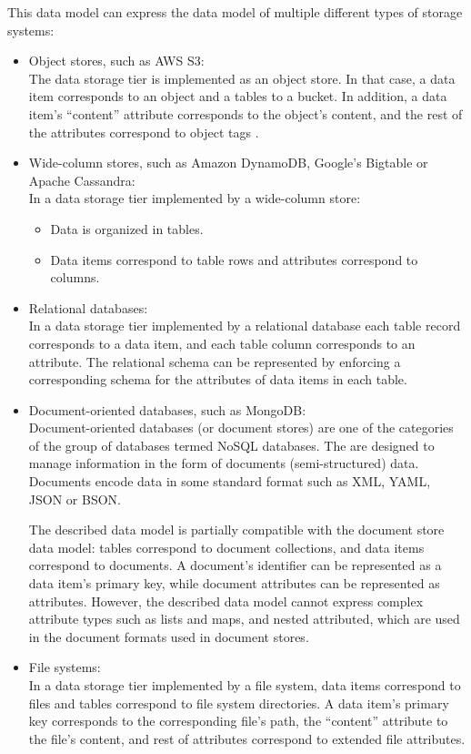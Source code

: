 This data model can express the data model of multiple different types of storage systems:
\begin{itemize}
  \item Object stores, such as AWS S3: \\
  The data storage tier is implemented as an object store.
  In that case, a data item corresponds to an object and a tables to a bucket.
  In addition, a data item's ``content'' attribute corresponds to the object's content, and the rest of the attributes
  correspond to object tags \cite{awss3:tagging}.

  \item Wide-column stores, such as Amazon DynamoDB, Google's Bigtable or Apache Cassandra: \\
  In a data storage tier implemented by a wide-column store:
  \begin{itemize}
    \item Data is organized in tables.
    \item Data items correspond to table rows and attributes correspond to columns.
  \end{itemize}
  \item Relational databases: \\
  In a data storage tier implemented by a relational database each table record corresponds to a data item, and each
  table column corresponds to an attribute.
  The relational schema can be represented by enforcing a corresponding schema for the attributes of data items in each
  table.

  \item Document-oriented databases, such as MongoDB: \\
  Document-oriented databases (or document stores) are one of the categories of the group of databases termed NoSQL
  databases.
  The are designed to manage information in the form of documents (semi-structured) data.
  Documents encode data in some standard format such as XML, YAML, JSON or BSON.

  The described data model is partially compatible with the document store data model:
  tables correspond to document collections, and data items correspond to documents.
  A document's identifier can be represented as a data item's primary key, while document attributes can be represented
  as attributes.
  However, the described data model cannot express complex attribute types such as lists and maps, and nested attributed,
  which are used in the document formats used in document stores.

  \item File systems: \\
  In a data storage tier implemented by a file system, data items correspond to files and tables correspond to file
  system directories.
  A data item's primary key corresponds to the corresponding file's path, the ``content'' attribute to the file's content,
  and rest of attributes correspond to extended file attributes.
\end{itemize}

